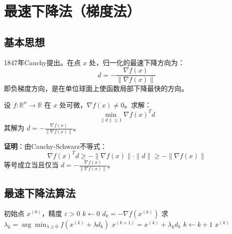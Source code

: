 \section{最速下降法（梯度法）}\label{sec:gradient}

\subsection{基本思想}

\begin{conceptbox}[最速下降方向]
1847年Cauchy提出。在点 $x$ 处，归一化的最速下降方向为：
\[
d = -\frac{\nabla f(x)}{\|\nabla f(x)\|}
\]
即负梯度方向，是在单位球面上使函数局部下降最快的方向。
\end{conceptbox}

\begin{lemma}[最速下降方向的验证]
设 $f: \mathbb{R}^n \to \mathbb{R}$ 在 $x$ 处可微，$\nabla f(x) \neq 0$。求解：
\[
\min_{\|d\| \leq 1} \nabla f(x)^T d
\]
其解为 $d = -\frac{\nabla f(x)}{\|\nabla f(x)\|}$。
\end{lemma}

\textbf{证明}：由Cauchy-Schwarz不等式：
\[
\nabla f(x)^T d \geq -\|\nabla f(x)\| \cdot \|d\| \geq -\|\nabla f(x)\|
\]
等号成立当且仅当 $d = -\frac{\nabla f(x)}{\|\nabla f(x)\|}$。

\subsection{最速下降法算法}

\begin{algorithm}[H]
\caption{最速下降法}
\begin{algorithmic}[1]
\Require 初始点 $x^{(0)}$，精度 $\varepsilon > 0$
\State $k \gets 0$
    \State $d_k = -\nabla f(x^{(k)})$
    \State 求 $\lambda_k = \arg\min_{\lambda \geq 0} f(x^{(k)} + \lambda d_k)$
    \State $x^{(k+1)} = x^{(k)} + \lambda_k d_k$
    \State $k \gets k + 1$
\EndWhile
\State \Return $x^{(k)}$
\end{algorithmic}
\end{algorithm}

